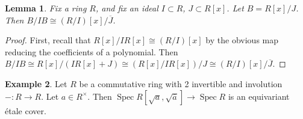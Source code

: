 \documentclass[draftthesis,tocnosub,noragright,centerchapter,10pt]{uiucthesis2009}
\DeclareMathOperator{\Spec}{Spec}
\theoremstyle{plain}
\newtheorem{lemma}{Lemma}
\theoremstyle{definition}
\newtheorem{example}[lemma]{Example}
\begin{document}





\begin{lemma}
Fix a ring $R$, and fix an ideal $I \subset R$, $J \subset R[x]$. Let
$B = R[x]/J$. Then $B/IB \cong (R/I)[x]/\overline J$.
\end{lemma}

\begin{proof}
First, recall that $R[x]/IR[x] \cong (R/I)[x]$ by the obvious map
reducing the coefficients of a polynomial. Then $B/IB \cong
R[x]/(IR[x]+J) \cong (R[x]/IR[x])/J \cong (R/I)[x]/\overline J$.
\end{proof}

\begin{example}
Let $R$ be a commutative ring with 2 invertible and involution $- : R
\rightarrow R$. Let $a \in R^\times$. Then $\Spec
R[\sqrt{a},\sqrt{\overline a}] \rightarrow \Spec R$ is an equivariant \'etale cover. 
\end{example}
\end{document}
